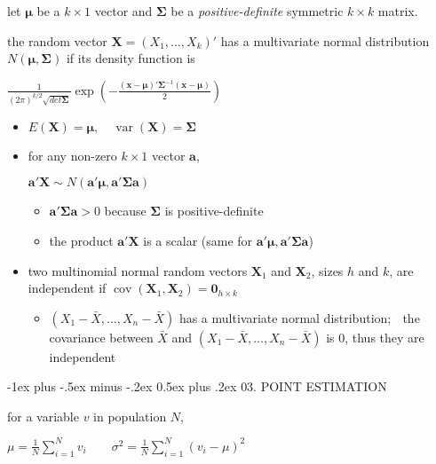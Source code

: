 \documentclass[10pt, landscape]{article}
\makeatletter
\renewcommand{\section}{\@startsection{section}{1}{0mm}%
  {-1ex plus -.5ex minus -.2ex}%
  {0.5ex plus .2ex}%
{\normalfont\large\bfseries}}
\newcommand{\cov}{\mathop{\mathrm{cov}}}
\newcommand{\var}{\mathop{\mathrm{var}}}
\newcommand{\Xbar}{\bar{X}}
\makeatother
\begin{document}
\begin{multicols*}{4}
  let $\bm{\mu}$ be a $k \times 1$ vector and $\bm{\Sigma}$ be a \textit{positive-definite} symmetric $k \times k$ matrix.

  \begin{tightcenter}
    the random vector $\bm{X} = (X_1, \dots, X_k)'$ has a multivariate normal distribution $N(\bm{\mu}, \bm{\Sigma})$ if its density function is 

    \( {\displaystyle{ \frac{1}{(2\pi)^{k/2} \sqrt{det\bm{\Sigma}}} \exp \left(-\frac{(\bm{x} - \bm{\mu})' \bm{\Sigma}^{-1}(\bm{x} - \bm{\mu})}{2}\right) }} \) 
  \end{tightcenter}

  \begin{itemize}
    \item $E(\bm{X}) = \bm{\mu}, \quad \var(\bm{X}) = \bm{\Sigma}$
    \item for any non-zero $k \times 1 $ vector $\bm{a}$, 
      \begin{tightcenter}
        $\bm{a'X} \sim N(\bm{a'\mu}, \bm{a'\Sigma a})$
      \end{tightcenter}
      \begin{itemize}
        \item $\bm{a}'\bm{\Sigma a} > 0$ because $\bm{\Sigma}$ is positive-definite
        \item the product $\bm{a'X}$ is a scalar (same for $\bm{a'\mu}, \bm{a'\Sigma a}$)
      \end{itemize}
    \item two multinomial normal random vectors $\bm{X}_1$ and $\bm{X}_2$, sizes $h$ and $k$, are independent if $\cov (\bm{X}_1, \bm{X}_2) = \bm{0}_{h \times k}$
      \begin{itemize}
        \item $(X_1-\Xbar, \dots, X_n - \Xbar)$ has a multivariate normal distribution; $\;$
          the covariance between $\Xbar$ and $(X_1-\Xbar, \dots, X_n - \Xbar)$ is $0$, thus they are independent
      \end{itemize}
  \end{itemize}

  \section{03. POINT ESTIMATION}

  for a variable $v$ in population $N$, 
  \begin{tightcenter}
    \( {\displaystyle{ 
        \mu = \frac{1}{N} \sum^N_{i=1} v_i
        \quad \quad 
        \sigma^2 = \frac{1}{N} \sum^N_{i=1} (v_i - \mu)^2
    }} \) 
  \end{tightcenter}


\end{multicols*}
\end{document}
